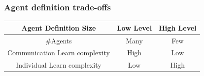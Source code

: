 \documentclass{beamer}
\begin{document}
	\begin{frame}
		\frametitle{Agent definition trade-offs}
		\begin{tabular}{|c|c|c|}
		\hline			
		\textbf{Agent Definition Size} & Low Level & High Level \\
		\hline			
		\#Agents & Many & Few \\
		\hline			
		Communication Learn complexity & High & Low \\
		\hline  
		Individual Learn complexity & Low & High \\
		\hline  
		\end{tabular}

	\end{frame}
\end{document}

